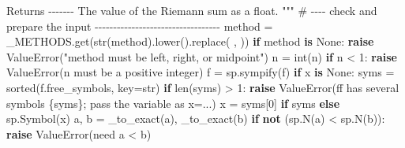 \documentclass[
  letterpaper,
  DIV=11,
  numbers=noendperiod]{scrreprt}
\newenvironment{Shaded}{\begin{snugshade}}{\end{snugshade}}
\newcommand{\BuiltInTok}[1]{\textcolor[rgb]{0.00,0.23,0.31}{#1}}
\newcommand{\CommentTok}[1]{\textcolor[rgb]{0.37,0.37,0.37}{#1}}
\newcommand{\ControlFlowTok}[1]{\textcolor[rgb]{0.00,0.23,0.31}{\textbf{#1}}}
\newcommand{\DecValTok}[1]{\textcolor[rgb]{0.68,0.00,0.00}{#1}}
\newcommand{\KeywordTok}[1]{\textcolor[rgb]{0.00,0.23,0.31}{\textbf{#1}}}
\newcommand{\NormalTok}[1]{\textcolor[rgb]{0.00,0.23,0.31}{#1}}
\newcommand{\OperatorTok}[1]{\textcolor[rgb]{0.37,0.37,0.37}{#1}}
\newcommand{\PreprocessorTok}[1]{\textcolor[rgb]{0.68,0.00,0.00}{#1}}
\newcommand{\SpecialCharTok}[1]{\textcolor[rgb]{0.37,0.37,0.37}{#1}}
\newcommand{\SpecialStringTok}[1]{\textcolor[rgb]{0.13,0.47,0.30}{#1}}
\newcommand{\StringTok}[1]{\textcolor[rgb]{0.13,0.47,0.30}{#1}}
\newcommand{\VariableTok}[1]{\textcolor[rgb]{0.07,0.07,0.07}{#1}}
\theoremstyle{plain}
\theoremstyle{plain}
\theoremstyle{definition}
\theoremstyle{definition}
\theoremstyle{definition}
\theoremstyle{plain}
\theoremstyle{plain}
\theoremstyle{remark}
\begin{document}
\begin{Shaded}
\begin{Highlighting}[]
\CommentTok{    Returns}
\CommentTok{    {-}{-}{-}{-}{-}{-}{-}}
\CommentTok{    The value of the Riemann sum as a float.}
\CommentTok{    """}
    \CommentTok{\# {-}{-}{-}{-} check and prepare the input {-}{-}{-}{-}{-}{-}{-}{-}{-}{-}{-}{-}{-}{-}{-}{-}{-}{-}{-}{-}{-}{-}{-}{-}{-}{-}{-}{-}{-}{-}{-}{-}{-}{-}}
\NormalTok{    method }\OperatorTok{=}\NormalTok{ \_METHODS.get(}\BuiltInTok{str}\NormalTok{(method).lower().replace(}\StringTok{\textquotesingle{} \textquotesingle{}}\NormalTok{, }\StringTok{\textquotesingle{}\textquotesingle{}}\NormalTok{))}
    \ControlFlowTok{if}\NormalTok{ method }\KeywordTok{is} \VariableTok{None}\NormalTok{:}
        \ControlFlowTok{raise} \PreprocessorTok{ValueError}\NormalTok{(}\StringTok{"method must be \textquotesingle{}left\textquotesingle{}, \textquotesingle{}right\textquotesingle{}, or \textquotesingle{}midpoint\textquotesingle{}"}\NormalTok{)}
\NormalTok{    n }\OperatorTok{=} \BuiltInTok{int}\NormalTok{(n)}
    \ControlFlowTok{if}\NormalTok{ n }\OperatorTok{\textless{}} \DecValTok{1}\NormalTok{:}
        \ControlFlowTok{raise} \PreprocessorTok{ValueError}\NormalTok{(}\StringTok{\textquotesingle{}n must be a positive integer\textquotesingle{}}\NormalTok{)}
\NormalTok{    f }\OperatorTok{=}\NormalTok{ sp.sympify(f)}
    \ControlFlowTok{if}\NormalTok{ x }\KeywordTok{is} \VariableTok{None}\NormalTok{:}
\NormalTok{        syms }\OperatorTok{=} \BuiltInTok{sorted}\NormalTok{(f.free\_symbols, key}\OperatorTok{=}\BuiltInTok{str}\NormalTok{)}
        \ControlFlowTok{if} \BuiltInTok{len}\NormalTok{(syms) }\OperatorTok{\textgreater{}} \DecValTok{1}\NormalTok{:}
            \ControlFlowTok{raise} \PreprocessorTok{ValueError}\NormalTok{(}\SpecialStringTok{f\textquotesingle{}f has several symbols }\SpecialCharTok{\{}\NormalTok{syms}\SpecialCharTok{\}}\SpecialStringTok{; pass the variable as x=...\textquotesingle{}}\NormalTok{)}
\NormalTok{        x }\OperatorTok{=}\NormalTok{ syms[}\DecValTok{0}\NormalTok{] }\ControlFlowTok{if}\NormalTok{ syms }\ControlFlowTok{else}\NormalTok{ sp.Symbol(}\StringTok{\textquotesingle{}x\textquotesingle{}}\NormalTok{)}
\NormalTok{    a, b }\OperatorTok{=}\NormalTok{ \_to\_exact(a), \_to\_exact(b)}
    \ControlFlowTok{if} \KeywordTok{not}\NormalTok{ (sp.N(a) }\OperatorTok{\textless{}}\NormalTok{ sp.N(b)):}
        \ControlFlowTok{raise} \PreprocessorTok{ValueError}\NormalTok{(}\StringTok{\textquotesingle{}need a \textless{} b\textquotesingle{}}\NormalTok{)}


\end{Highlighting}
\end{Shaded}
\end{document}
